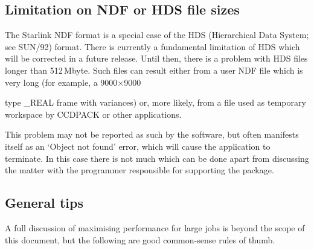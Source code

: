 \documentclass[twoside,11pt]{article}
\newcommand{\html}[1]{}
\newcommand{\latex}[1]{#1}
\newcommand{\xref}[3]{#1}
\newcommand{\xlabel}[1]{}
\begin{document}
\subsection{\xlabel{HDS-LIMIT}Limitation on NDF or HDS file sizes}

The Starlink NDF format is a special case of the HDS (Hierarchical Data
System; see \xref{SUN/92}{sun92}{}\cite{SUN92}) format.
There is currently a fundamental limitation of HDS which will be corrected
in a future release.
Until then, there is a problem with HDS files longer than 512\,Mbyte. 
Such files can result either from a user NDF file which is very long 
(for example, a \latex{9000$\times$9000}
\html{9000x9000 }
type \_REAL frame with variances) or, more likely,
from a file used as temporary workspace by CCDPACK or other applications.

This problem may not be reported as such by the software,
but often manifests itself as an `Object not found' error,
which will cause the application to terminate.
In this case there is not much which can be done apart from
discussing the matter with the programmer 
responsible for supporting the package.

\subsection{\xlabel{LARGE-GENERAL}General tips}

A full discussion of maximising performance for large jobs 
is beyond the scope of this document, 
but the following are good common-sense rules of thumb.
\end{document}
